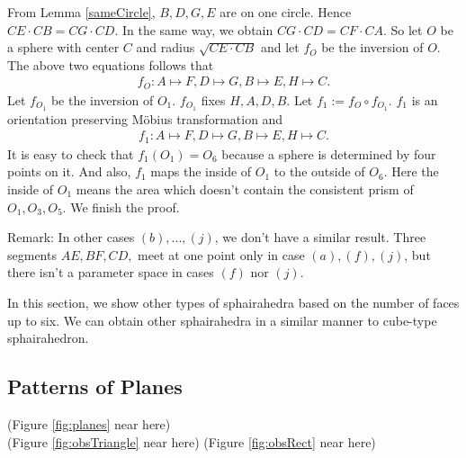 \documentclass[suppldata, dvipdfmx]{interact}
\theoremstyle{plain}%
\theoremstyle{definition}
\theoremstyle{remark}
\theoremstyle{problemstyle}
\begin{document}
From Lemma \ref{sameCircle}, $B, D, G, E$ are on one circle. Hence
$CE \cdot CB = CG \cdot CD$. In the same way, we obtain 
$CG \cdot CD = CF \cdot CA$. So let $O$ be a sphere with center $C$ and
radius $\sqrt{CE \cdot CB}$ and let $f_O$ be the inversion of $O$.
The above two equations follows that
\begin{align*}
 f_O: A \mapsto F, D \mapsto G, B \mapsto E, H \mapsto C.
\end{align*}
Let $f_{O_1}$ be the inversion of $O_1$. $f_{O_1}$ fixes $H, A, D, B$.
Let $f_1 := f_O \circ f_{O_1}$.
$f_1$ is an orientation preserving M\"obius transformation and
\begin{align*}
 f_1 : A \mapsto F, D \mapsto G, B \mapsto E, H \mapsto C.
\end{align*}
It is easy to check that $f_1(O_1) = O_6$ because a sphere is determined
by four points on it. And also, $f_1$ maps the inside of $O_1$ to the
outside of $O_6$. Here the inside of $O_1$ means the area which doesn't
contain the consistent prism of $O_1, O_3, O_5$. We finish the
proof.

Remark:
In other cases $(b),...,(j)$, we don't have a similar result. Three
segments $AE, BF, CD,$ meet at one point only in case $(a), (f), (j)$, but
there isn't a parameter space in cases $(f)$ nor $(j)$.



In this section, we show other types of sphairahedra based on the
number of faces up to six.
We can obtain other sphairahedra in a similar manner to cube-type
sphairahedron.




\subsection{Patterns of Planes}

\noindent(Figure \ref{fig:planes}
 near here)\\
(Figure \ref{fig:obsTriangle} near here)
(Figure \ref{fig:obsRect} near here)
\end{document}
